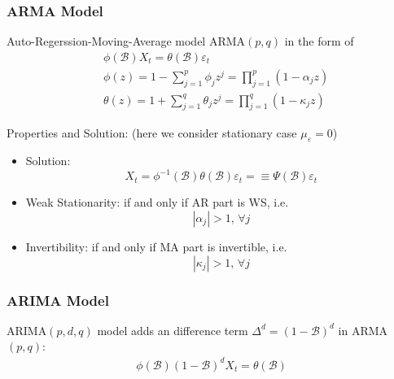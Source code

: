     

\subsubsection{ARMA Model}
    Auto-Regerssion-Moving-Average model ARMA$ (p,q) $ in the form of 
    \begin{align}
        &\phi (\mathscr{B} )X_t=\theta (\mathscr{B} )\varepsilon _t\\
        &\phi (z)=1-\sum_{j=1}^p \phi _jz^j=\prod_{j=1}^p(1-\alpha _jz)\\
        &\theta (z)=1+\sum_{j=1}^q\theta _jz^j=\prod_{j=1}^q(1-\kappa _jz)
    \end{align}
    
    
    \begin{point}
        Properties and Solution: (here we consider stationary case $ \mu _\varepsilon =0 $)
    \end{point}

    \begin{itemize}[topsep=2pt,itemsep=0pt]
        \item Solution:
        \begin{equation}
            X_t=\phi ^{-1}(\mathscr{B} )\theta (\mathscr{B} )\varepsilon _t =\equiv \Psi (\mathscr{B} )\varepsilon _t
        \end{equation}
        \item Weak Stationarity: if and only if AR part is WS, i.e.
        \begin{equation}
            |\alpha _j|>1,\,\forall j 
        \end{equation}
        \item Invertibility: if and only if MA part is invertible, i.e.
        \begin{equation}
            |\kappa _j|>1,\,\forall j 
        \end{equation}
        
    \end{itemize}
    
\subsubsection{ARIMA Model}
    ARIMA$ (p,d,q) $ model adds an difference term $ \Delta ^d=(1-\mathscr{B} )^d $ in ARMA$ (p,q) $:
    \begin{align}
        \phi (\mathscr{B} )(1-\mathscr{B} )^dX_t=\theta (\mathscr{B} )
    \end{align}
    
